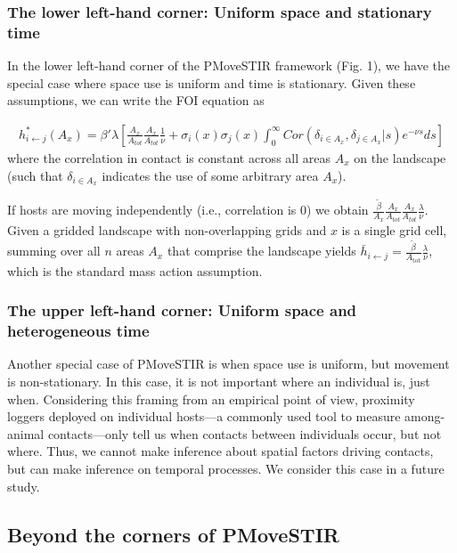 \documentclass[letterpaper]{article}
\begin{document}
\subsubsection*{The lower left-hand corner: Uniform space and stationary time}

In the lower left-hand corner of the PMoveSTIR framework (Fig. 1), we have the special case where space use is uniform and time is stationary. Given these assumptions, we can write the FOI equation as

\begin{equation}
    \begin{aligned}
        h^*_{i \leftarrow j}(A_x) = \beta' \lambda \left[\frac{A_x}{A_{tot}}\frac{A_x}{A_{tot}} \frac{1}{\nu} + \sigma_i(x) \sigma_j(x) \int_{0}^{\infty} Cor(\delta_{i \in A_x}, \delta_{j \in A_x} | s) e^{-\nu s} ds\right]
    \end{aligned}
    \label{eq:uniform_stationary1}
\end{equation}
where the correlation in contact is constant across all areas $A_x$ on the landscape (such that $\delta_{i \in A_x}$ indicates the use of some arbitrary area $A_x$).  

If hosts are moving independently (i.e., correlation is 0) we obtain $\frac{\tilde{\beta}}{A_x} \frac{A_x}{A_{tot}} \frac{A_x}{A_{tot}}  \frac{\lambda}{\nu}$. Given a gridded landscape with non-overlapping grids and $x$ is a single grid cell, summing over all $n$ areas $A_x$ that comprise the landscape yields $\bar{h}_{i \leftarrow j} =\frac{\tilde{\beta}}{A_\text{tot}} \frac{\lambda}{\nu}$, which is the standard mass action assumption.  


\subsubsection*{The upper left-hand corner: Uniform space and heterogeneous time}

Another special case of PMoveSTIR is when space use is uniform, but movement is non-stationary.  In this case, it is not important where an individual is, just when. Considering this framing from an empirical point of view, proximity loggers deployed on individual hosts---a commonly used tool to measure among-animal contacts---only tell us when contacts between individuals occur, but not where.  Thus, we cannot make inference about spatial factors driving contacts, but can make inference on temporal processes.  We consider this case in a future study.

\subsection*{Beyond the corners of PMoveSTIR}
\end{document}
